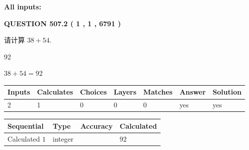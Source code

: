 \documentclass{ctexart}
\begin{document}
   
   
   
\noindent{}
   
   
   
   
\noindent\vspace{0.1in}\hspace{-0.08in} {\textbf{\Large{All inputs: }}}
   
   
  
\vspace{0.2in}
  
{\textbf{\Large{QUESTION
507.2 
 ( 1 , 1 , 6791 )
}}}
  
  
 
请计算 $ %
38 +  %
54 $.
 
 
 
\noindent{}
 
 

92
 
 
\noindent{}
 
 

 
 
 
\noindent{}
 
 

$ %
38 +  %
54=   %
92$
 
 
\noindent{}
 
 

 
   
   
   
   
\noindent\begin{tabular}{|l|l|l|l|l|l|l|}
 \hline
Inputs & Calculates & Choices & Layers & Matches & Answer & Solution \\ \hline
 2  & 
 1  & 
 0
  & 
 0  & 
 0  & 
  yes & 
  yes 
  \\ \hline
 \end{tabular}
   
   
   
   
\noindent{}
   
   
  
  
\noindent\begin{tabular}{|l|l|l|l|}
\hline
 Sequential & Type & Accuracy & Calculated \\ 
\hline
 
 
  Calculated $  1 $ & integer &  & 
  $ 92 $ 
 \\  \hline  
 \end{tabular}
   
\end{document}
